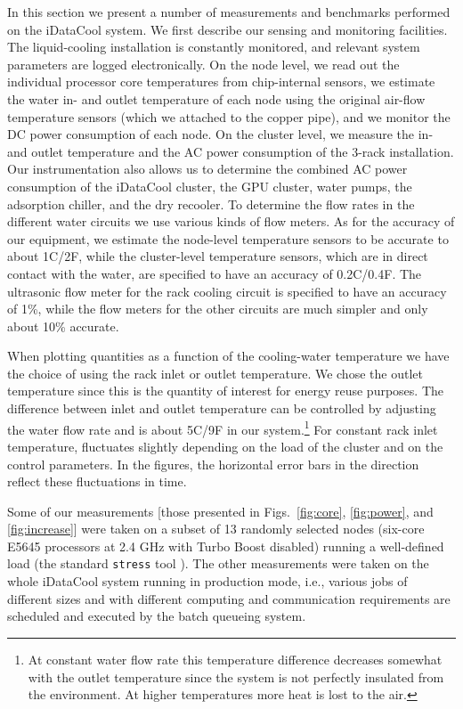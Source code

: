In this section we present a number of measurements and benchmarks
performed on the iDataCool system.  We first describe our sensing and
monitoring facilities.  The liquid-cooling installation is constantly
monitored, and relevant system parameters are logged electronically.
On the node level, we read out the individual processor core
temperatures from chip-internal sensors, we estimate the water in- and
outlet temperature of each node using the original air-flow
temperature sensors (which we attached to the copper pipe), and we
monitor the DC power consumption of each node.  On the cluster level,
we measure the in- and outlet temperature and the AC power consumption
of the 3-rack installation.  Our instrumentation also allows us to
determine the combined AC power consumption of the iDataCool cluster,
the GPU cluster, water pumps, the adsorption chiller, and the dry
recooler.  To determine the flow rates in the different water circuits
we use various kinds of flow meters.  As for the accuracy of our
equipment, we estimate the node-level temperature sensors to be
accurate to about 1C/2F, while the cluster-level
temperature sensors, which are in direct contact with the water, are
specified to have an accuracy of 0.2C/0.4F.  The
ultrasonic flow meter for the rack cooling circuit is specified to
have an accuracy of 1\%, while the flow meters for the other circuits
are much simpler and only about 10\% accurate. 

When plotting quantities as a function of the cooling-water
temperature we have the choice of using the rack inlet or outlet
temperature.  We chose the outlet temperature  since
this is the quantity of interest for energy reuse purposes.  The
difference between inlet and outlet temperature can be controlled by
adjusting the water flow rate and is about 5C/9F in
our system.\footnote{At constant water flow rate this temperature
  difference decreases somewhat with the outlet temperature since the
  system is not perfectly insulated from the environment.  At higher
  temperatures more heat is lost to the air.}  For constant rack inlet
temperature,  fluctuates slightly depending on the load
of the cluster and on the control parameters.  In the figures, the
horizontal error bars in the  direction reflect these
fluctuations in time.

Some of our measurements [those presented in Figs.~\ref{fig:core},
\ref{fig:power}, and \ref{fig:increase}] were taken on a subset of 13
randomly selected nodes (six-core E5645 processors at 2.4 GHz with
Turbo Boost disabled) running a well-defined load (the standard
\texttt{stress} tool \cite{stress}).  The other measurements were
taken on the whole iDataCool system running in production mode, i.e.,
various jobs of different sizes and with different computing and
communication requirements are scheduled and executed by the batch
queueing system.

